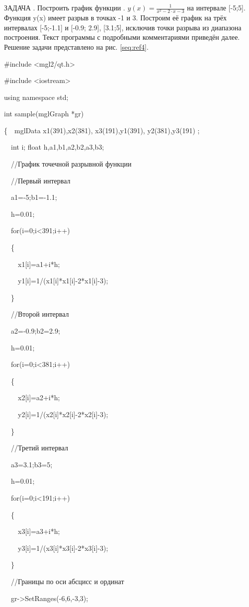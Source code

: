 ЗАДАЧА {\theqwerty\label{seq:ref4a}}. Построить график функции . $y(x)=\frac{1}{x^{2}-2\cdot
x-3}$ на интервале [-5;5]. Функция y(x) имеет разрыв в точках -1 и 3. Построим её график на трёх интервалах [-5;-1.1] и
[-0.9; 2.9], [3.1;5], исключив точки разрыва из диапазона построения. Текст программы с подробными комментариями
приведён далее. Решение задачи представлено на рис. \ref{seq:ref4}.

\#include {\textless}mgl2/qt.h{\textgreater}

\#include {\textless}iostream{\textgreater}

using namespace std;

int sample(mglGraph *gr)

\{\ \ mglData x1(391),x2(381), x3(191),y1(391), y2(381),y3(191) ;

\ \ int i; float h,a1,b1,a2,b2,a3,b3;

\ \ //График точечной разрывной функции

\ \ //Первый интервал

\ \ a1=-5;b1=-1.1;

\ \ h=0.01;

\ \ for(i=0;i{\textless}391;i++)

\ \ \{

\ \ \ \ x1[i]=a1+i*h;

\ \ \ \ y1[i]=1/(x1[i]*x1[i]-2*x1[i]-3);

\ \ \}

\ \ //Второй интервал

\ \ a2=-0.9;b2=2.9;

\ \ h=0.01;

\ \ for(i=0;i{\textless}381;i++)

\ \ \{

\ \ \ \ x2[i]=a2+i*h;

\ \ \ \ y2[i]=1/(x2[i]*x2[i]-2*x2[i]-3);

\ \ \}

\ \ //Третий интервал

\ \ a3=3.1;b3=5;

\ \ h=0.01;

\ \ for(i=0;i{\textless}191;i++)

\ \ \{

\ \ \ \ x3[i]=a3+i*h;

\ \ \ \ y3[i]=1/(x3[i]*x3[i]-2*x3[i]-3);

\ \ \}

\ \ //Границы по оси абсцисс и ординат

\ \ gr-{\textgreater}SetRanges(-6,6,-3,3);

